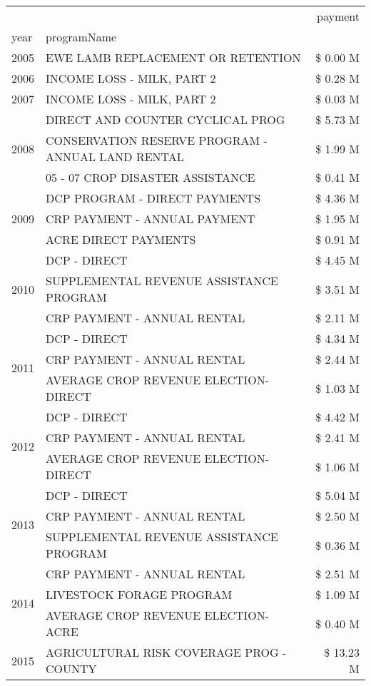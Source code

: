 \begin{tabular}{llr}
\toprule
 &  & payment \\
year & programName &  \\
\midrule
2005 & EWE LAMB REPLACEMENT OR RETENTION & \$ 0.00 M \\
\cline{1-3}
2006 & INCOME LOSS - MILK, PART 2 & \$ 0.28 M \\
\cline{1-3}
2007 & INCOME LOSS - MILK, PART 2 & \$ 0.03 M \\
\cline{1-3}
\multirow[t]{3}{*}{2008} & DIRECT AND COUNTER CYCLICAL PROG & \$ 5.73 M \\
 & CONSERVATION RESERVE PROGRAM - ANNUAL LAND RENTAL & \$ 1.99 M \\
 & 05 - 07 CROP DISASTER ASSISTANCE & \$ 0.41 M \\
\cline{1-3}
\multirow[t]{3}{*}{2009} & DCP PROGRAM - DIRECT PAYMENTS & \$ 4.36 M \\
 & CRP PAYMENT - ANNUAL PAYMENT & \$ 1.95 M \\
 & ACRE DIRECT PAYMENTS & \$ 0.91 M \\
\cline{1-3}
\multirow[t]{3}{*}{2010} & DCP - DIRECT & \$ 4.45 M \\
 & SUPPLEMENTAL REVENUE ASSISTANCE PROGRAM & \$ 3.51 M \\
 & CRP PAYMENT - ANNUAL RENTAL & \$ 2.11 M \\
\cline{1-3}
\multirow[t]{3}{*}{2011} & DCP - DIRECT & \$ 4.34 M \\
 & CRP PAYMENT - ANNUAL RENTAL & \$ 2.44 M \\
 & AVERAGE CROP REVENUE ELECTION-DIRECT & \$ 1.03 M \\
\cline{1-3}
\multirow[t]{3}{*}{2012} & DCP - DIRECT & \$ 4.42 M \\
 & CRP PAYMENT - ANNUAL RENTAL & \$ 2.41 M \\
 & AVERAGE CROP REVENUE ELECTION-DIRECT & \$ 1.06 M \\
\cline{1-3}
\multirow[t]{3}{*}{2013} & DCP - DIRECT & \$ 5.04 M \\
 & CRP PAYMENT - ANNUAL RENTAL & \$ 2.50 M \\
 & SUPPLEMENTAL REVENUE ASSISTANCE PROGRAM & \$ 0.36 M \\
\cline{1-3}
\multirow[t]{3}{*}{2014} & CRP PAYMENT - ANNUAL RENTAL & \$ 2.51 M \\
 & LIVESTOCK FORAGE PROGRAM & \$ 1.09 M \\
 & AVERAGE CROP REVENUE ELECTION-ACRE & \$ 0.40 M \\
\cline{1-3}
\multirow[t]{3}{*}{2015} & AGRICULTURAL RISK COVERAGE PROG - COUNTY & \$ 13.23 M \\

\end{tabular}
